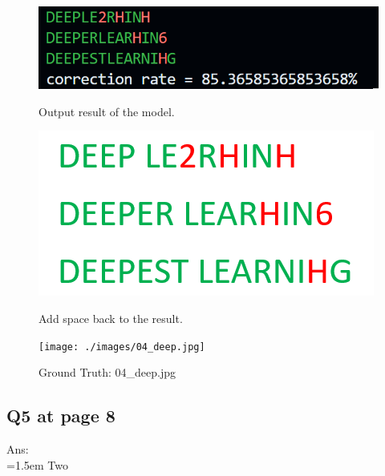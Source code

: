 \documentclass{article}
\begin{document}
\begin{figure}[H]
	\centering
	\begin{minipage}{0.33\linewidth}
		\centering
		\includegraphics[width=\linewidth]{./Q44_res4.png}
		\caption{Output result of the model.}
		\label{fig:Q44_res4}
	\end{minipage}%
	\hfill
	\begin{minipage}{0.33\linewidth}
		\centering
		\includegraphics[width=0.8\linewidth, height=0.24\columnwidth]{./Q44_add_space4.png}
		\caption{Add space back to the result.}
		\label{fig:Q44_add_space4}
	\end{minipage}%
	\hfill
	\begin{minipage}{0.33\linewidth}
		\centering
		\texttt{[image: ./images/04\_deep.jpg]}
		\caption{Ground Truth: 04\_deep.jpg}
		\label{fig:Q44_res4_gt}
	\end{minipage}
\end{figure}

	\newpage
	
	\subsection*{Q5 at page 8\texttt{}}
	Ans:\\
	\hangindent=1.5em \hspace{1.5em}Two 



	\newpage
\end{document}
